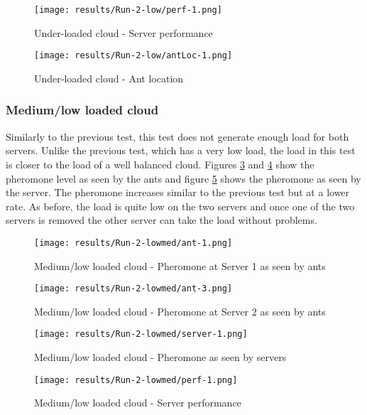 \begin{figure}
	\centering
		\texttt{[image: results/Run-2-low/perf-1.png]}
	\caption{Under-loaded cloud - Server performance}
	\label{fig:2serv-perf-low}
\end{figure}

\begin{figure}
	\centering
		\texttt{[image: results/Run-2-low/antLoc-1.png]}
	\caption{Under-loaded cloud - Ant location}
	\label{fig:2serv-antloc-low}
\end{figure}

\subsubsection{Medium/low loaded cloud}

Similarly to the previous test, this test does not generate enough load for both servers. Unlike the previous test, which has a very low load, the load in this test is closer to the load of a well balanced cloud. Figures \ref{fig:2serv-ant1-medlow} and \ref{fig:2serv-ant3-medlow} show the pheromone level as seen by the ants and figure \ref{fig:2serv-pher-medlow} shows the pheromone as seen by the server. The pheromone increases similar to the previous test but at a lower rate. As before, the load is quite low on the two servers and once one of the two servers is removed the other server can take the load without problems.

\begin{figure}[!ht]
	\centering
		\texttt{[image: results/Run-2-lowmed/ant-1.png]}
	\caption{Medium/low loaded cloud - Pheromone at Server 1 as seen by ants}
	\label{fig:2serv-ant1-medlow}
\end{figure}

\begin{figure}
	\centering
		\texttt{[image: results/Run-2-lowmed/ant-3.png]}
	\caption{Medium/low loaded cloud - Pheromone at Server 2 as seen by ants}
	\label{fig:2serv-ant3-medlow}
\end{figure}

\begin{figure}
	\centering
		\texttt{[image: results/Run-2-lowmed/server-1.png]}
	\caption{Medium/low loaded cloud - Pheromone as seen by servers}
	\label{fig:2serv-pher-medlow}
\end{figure}

\begin{figure}
	\centering
		\texttt{[image: results/Run-2-lowmed/perf-1.png]}
	\caption{Medium/low loaded cloud - Server performance}
	\label{fig:2serv-perf-medlow}
\end{figure}

